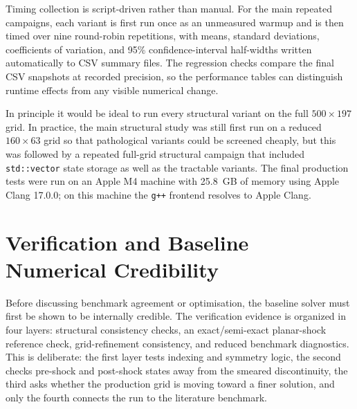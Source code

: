 \documentclass[final,3p,times,twocolumn]{elsarticle}
\begin{document}
Timing collection is script-driven rather than manual. For the main repeated campaigns, each variant is first run once as an unmeasured warmup and is then timed over nine round-robin repetitions, with means, standard deviations, coefficients of variation, and 95\% confidence-interval half-widths written automatically to CSV summary files. The regression checks compare the final CSV snapshots at recorded precision, so the performance tables can distinguish runtime effects from any visible numerical change.

In principle it would be ideal to run every structural variant on the full $500 \times 197$ grid. In practice, the main structural study was still first run on a reduced $160 \times 63$ grid so that pathological variants could be screened cheaply, but this was followed by a repeated full-grid structural campaign that included \texttt{std::vector} state storage as well as the tractable variants. The final production tests were run on an Apple M4 machine with 25.8~GB of memory using Apple Clang 17.0.0; on this machine the \texttt{g++} frontend resolves to Apple Clang.

\section{Verification and Baseline Numerical Credibility}

Before discussing benchmark agreement or optimisation, the baseline solver must first be shown to be internally credible. The verification evidence is organized in four layers: structural consistency checks, an exact/semi-exact planar-shock reference check, grid-refinement consistency, and reduced benchmark diagnostics. This is deliberate: the first layer tests indexing and symmetry logic, the second checks pre-shock and post-shock states away from the smeared discontinuity, the third asks whether the production grid is moving toward a finer solution, and only the fourth connects the run to the literature benchmark.
\end{document}
